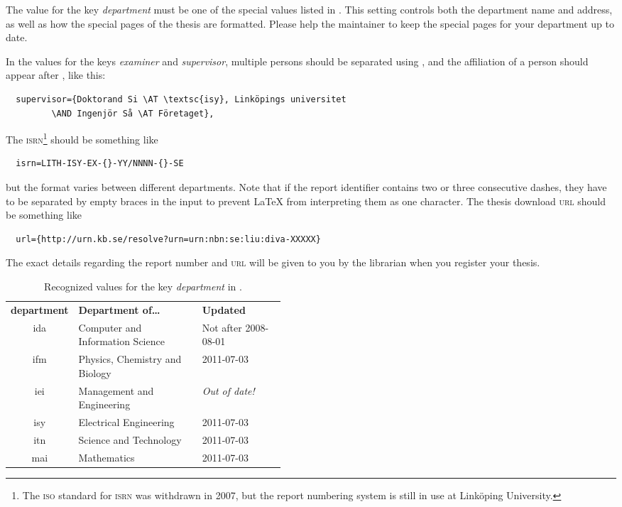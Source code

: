 The value for the key \emph{department} must be one of the special values listed in .  This setting controls both the department name and address, as well as how the special pages of the thesis are formatted.  Please help the \rtthesis maintainer to keep the special pages for your department up to date.

In the values for the keys \emph{examiner} and \emph{supervisor}, multiple persons should be separated using , and the affiliation of a person should appear after , like this:
{\verbatimsize
\begin{verbatim}
  supervisor={Doktorand Si \AT \textsc{isy}, Linköpings universitet
         \AND Ingenjör Så \AT Företaget},
\end{verbatim}}

The \textsc{isrn}\footnote{The \textsc{iso} standard for \textsc{isrn} was withdrawn in 2007, but the report numbering system is still in use at Linköping University.} should be something like
{\verbatimsize
\begin{verbatim}
  isrn=LITH-ISY-EX-{}-YY/NNNN-{}-SE
\end{verbatim}}
but the format varies between different departments.  Note that if the report identifier contains two or three consecutive dashes, they have to be separated by empty braces in the input to prevent \LaTeX{} from interpreting them as one character.  The thesis download \textsc{url} should be something like
{\verbatimsize
\begin{verbatim}
  url={http://urn.kb.se/resolve?urn=urn:nbn:se:liu:diva-XXXXX}
\end{verbatim}}
The exact details regarding the report number and \textsc{url} will be given to you by the librarian when you register your thesis.

\begin{table}[tbp]
  \centering
  \caption{\label{tab:department}%
    Recognized values for the key \emph{department} in .}

  \begin{tabular}{>{\ttfamily}c p{0.45\linewidth} l}
    \toprule%
    \textbf{department} & \textbf{Department of\ldots} & \textbf{Updated}\\
    \otoprule%
    ida & Computer and Information Science & Not after 2008-08-01\\
    ifm & Physics, Chemistry and Biology & 2011-07-03\\
    iei & Management and Engineering & \emph{Out of date!}\\
    isy & Electrical Engineering & 2011-07-03\\
    itn & Science and Technology & 2011-07-03\\
    mai & Mathematics & 2011-07-03\\
    \bottomrule%
  \end{tabular}
\end{table}


